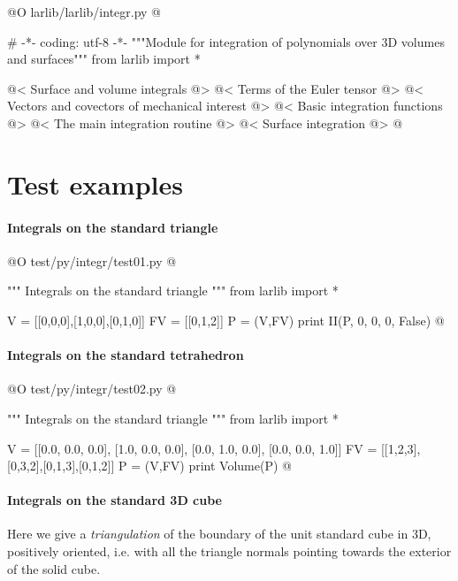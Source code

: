 \documentclass[11pt,oneside]{article}	%
\begin{document}
@O larlib/larlib/integr.py 
@{# -*- coding: utf-8 -*-
"""Module for integration of polynomials over 3D volumes and surfaces"""
from larlib import *

@< Surface and volume integrals @>
@< Terms of the Euler tensor @>
@< Vectors and covectors of mechanical interest @>
@< Basic integration functions @>
@< The main integration routine @>
@< Surface integration @>
@}



\section{Test examples}

\paragraph{Integrals on the standard triangle}
@O test/py/integr/test01.py
@{""" Integrals on the standard triangle """
from larlib import *

V = [[0,0,0],[1,0,0],[0,1,0]]
FV = [[0,1,2]]
P = (V,FV)
print II(P, 0, 0, 0, False)
@}


\paragraph{Integrals on the standard tetrahedron}
@O test/py/integr/test02.py
@{""" Integrals on the standard triangle """
from larlib import *

V = [[0.0, 0.0, 0.0], [1.0, 0.0, 0.0], [0.0, 1.0, 0.0], [0.0, 0.0, 1.0]]
FV = [[1,2,3],[0,3,2],[0,1,3],[0,1,2]]
P = (V,FV)
print Volume(P)
@}


\paragraph{Integrals on the standard 3D cube}

Here we give a \emph{triangulation} of the boundary of the unit standard cube in 3D,
positively oriented, i.e. with all the triangle normals pointing towards the
exterior of the solid cube.
\end{document}
